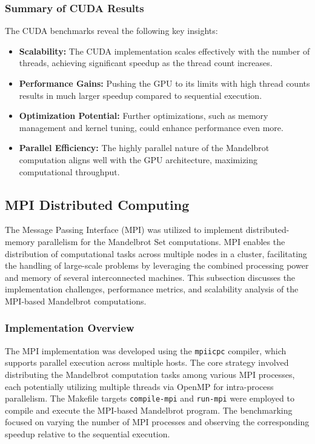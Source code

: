 \documentclass[
	report, %
	11pt, %
]{CSUniSchoolLabReport}
\newcounter{ct}
\begin{document}
\subsubsection{Summary of CUDA Results}

The CUDA benchmarks reveal the following key insights:

\begin{itemize}
	\item \textbf{Scalability:} The CUDA implementation scales effectively with the number of threads, achieving significant speedup as the thread count increases.
	\item \textbf{Performance Gains:} Pushing the GPU to its limits with high thread counts results in much larger speedup compared to sequential execution.
	\item \textbf{Optimization Potential:} Further optimizations, such as memory management and kernel tuning, could enhance performance even more.
	\item \textbf{Parallel Efficiency:} The highly parallel nature of the Mandelbrot computation aligns well with the GPU architecture, maximizing computational throughput.
\end{itemize}

\subsection{MPI Distributed Computing}

The Message Passing Interface (MPI) was utilized to implement distributed-memory parallelism for the Mandelbrot Set computations. MPI enables the distribution of computational tasks across multiple nodes in a cluster, facilitating the handling of large-scale problems by leveraging the combined processing power and memory of several interconnected machines. This subsection discusses the implementation challenges, performance metrics, and scalability analysis of the MPI-based Mandelbrot computations.

\subsubsection{Implementation Overview}

The MPI implementation was developed using the \texttt{mpiicpc} compiler, which supports parallel execution across multiple hosts. The core strategy involved distributing the Mandelbrot computation tasks among various MPI processes, each potentially utilizing multiple threads via OpenMP for intra-process parallelism. The Makefile targets \texttt{compile-mpi} and \texttt{run-mpi} were employed to compile and execute the MPI-based Mandelbrot program. The benchmarking focused on varying the number of MPI processes and observing the corresponding speedup relative to the sequential execution.
\end{document}
